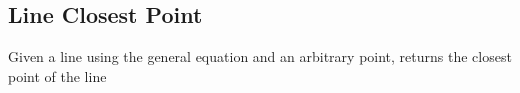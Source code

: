 \subsection{Line Closest Point}

Given a line using the general equation and an arbitrary point, returns the closest point of the line
